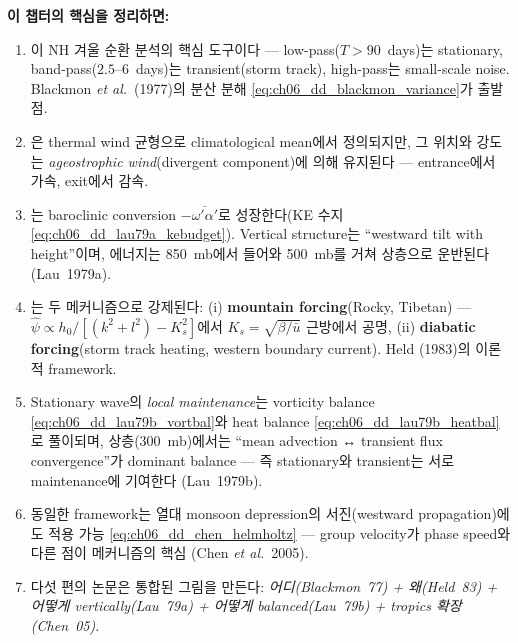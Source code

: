 \begin{remarkbox}
\textbf{이 챕터의 핵심을 정리하면:}
\begin{enumerate}
  \item {}이 NH 겨울 순환 분석의 핵심 도구이다 ---
        low-pass($T>90$~days)는 stationary, band-pass($2.5$--$6$~days)는
        transient(storm track), high-pass는 small-scale noise.
        Blackmon \emph{et al.}\ (1977)의 분산 분해
        \eqref{eq:ch06_dd_blackmon_variance}가 출발점.
  \item {}은 thermal wind 균형으로 climatological mean에서 정의되지만,
        그 위치와 강도는 \emph{ageostrophic wind}(divergent component)에 의해
        유지된다 --- entrance에서 가속, exit에서 감속.
  \item {}는 baroclinic conversion
        $-\overline{\omega'\alpha'}$로 성장한다(KE 수지
        \eqref{eq:ch06_dd_lau79a_kebudget}).
        Vertical structure는 ``westward tilt with height''이며,
        에너지는 850~mb에서 들어와 500~mb를 거쳐 상층으로 운반된다 (Lau~1979a).
  \item {}는 두 메커니즘으로 강제된다:
        (i) \textbf{mountain forcing}(Rocky, Tibetan) ---
        $\hat\psi \propto h_0/[(k^2+l^2) - K_s^2]$에서 $K_s = \sqrt{\beta/\bar u}$
        근방에서 공명, (ii) \textbf{diabatic forcing}(storm track heating,
        western boundary current).  Held (1983)의 이론적 framework.
  \item Stationary wave의 \emph{local maintenance}는 vorticity balance
        \eqref{eq:ch06_dd_lau79b_vortbal}와 heat balance
        \eqref{eq:ch06_dd_lau79b_heatbal}로 풀이되며, 상층(300~mb)에서는
        ``mean advection ↔ transient flux convergence''가 dominant balance ---
        즉 stationary와 transient는 서로 maintenance에 기여한다 (Lau~1979b).
  \item 동일한  framework는 열대 monsoon
        depression의 서진(westward propagation)에도 적용 가능
        \eqref{eq:ch06_dd_chen_helmholtz} --- group velocity가 phase speed와
        다른 점이 메커니즘의 핵심 (Chen \emph{et al.}\ 2005).
  \item 다섯 편의 논문은 통합된 그림을 만든다:
        \emph{어디(Blackmon~77) + 왜(Held~83) + 어떻게 vertically(Lau~79a)
        + 어떻게 balanced(Lau~79b) + tropics 확장(Chen~05)}.
\end{enumerate}
\end{remarkbox}

